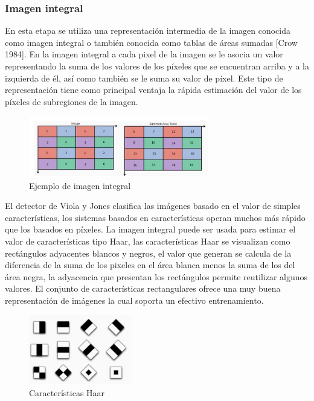   \subsubsection{Imagen integral}
   En esta etapa se utiliza una representación intermedia de la imagen conocida como imagen integral o también conocida como tablas de áreas sumadas [Crow 1984]. En la imagen integral a cada pixel de la imagen se le asocia un valor representando la suma de los valores de los píxeles que se encuentran arriba y a la izquierda de él, así como también se le suma su valor de píxel. Este tipo de representación tiene como principal ventaja la rápida estimación del valor de los píxeles de subregiones de la imagen.
   \begin{figure}[htbp]
   	\centering
   	\includegraphics[width=0.7\textwidth]{./pictures/imagenIntegral}
   	\caption{Ejemplo de imagen integral}\label{fig: figura}
   \end{figure}
   El detector de Viola y Jones clasifica las imágenes basado en el valor de simples características, los sistemas basados en características operan muchos más rápido que los basados en píxeles. La imagen integral puede ser usada para estimar el valor de características tipo Haar, las características Haar se visualizan como rectángulos adyacentes blancos y negros, el valor que generan se calcula de la diferencia de la suma de los pixeles en el área blanca menos la suma de los del área negra, la adyacencia que presentan los rectángulos permite reutilizar algunos valores. El conjunto de características rectangulares ofrece una muy buena representación de imágenes la cual soporta un efectivo entrenamiento.
   
   \begin{figure}[htbp]
   	\centering
   	\includegraphics[width=0.4\textwidth]{./pictures/haar}
   	\caption{Características Haar}\label{fig: figura}
   \end{figure}
   
